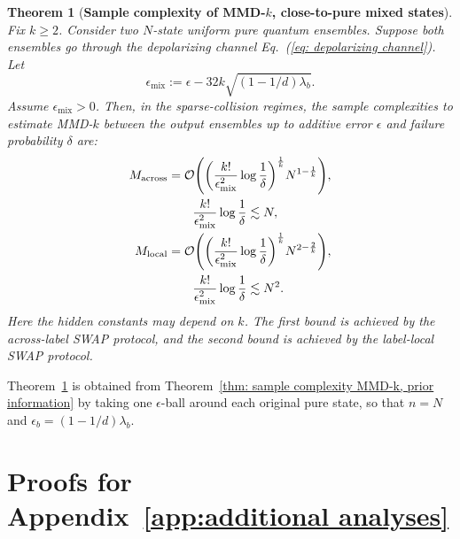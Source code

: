 \documentclass[aps,prx,reprint,superscriptaddress,amsmath,amssymb,longbibliography,floatfix]{revtex4-2}
\newcommand{\scO}{\mathcal{O}}
\theoremstyle{plain}
\newtheorem{theorem}{Theorem}[section]
\theoremstyle{definition}
\theoremstyle{remark}
\begin{document}
\begin{theorem}[\textbf{Sample complexity of MMD-$k$, close-to-pure mixed states}]
    \label{thm: sample complexity MMD-k, mixed state}
    Fix $k\ge2$. Consider two $N$-state uniform pure quantum ensembles. Suppose both ensembles go through the depolarizing channel Eq.~(\ref{eq: depolarizing channel}). Let
    \begin{equation}
        \epsilon_{\mathrm{mix}}
        :=
        \epsilon-32k\sqrt{(1-1/d)\lambda_b}.
    \end{equation}
    Assume $\epsilon_{\mathrm{mix}}>0$. Then, in the sparse-collision regimes, the sample complexities to estimate MMD-$k$ between the output ensembles up to additive error $\epsilon$ and failure probability $\delta$ are:
    \begin{align}
M_{\mathrm{across}}
        &=
        \scO\Bigg(
        \bigg(
            \frac{k!}{\epsilon_{\mathrm{mix}}^2}
            \log\frac{1}{\delta}
        \bigg)^{\frac1k}
        N^{1-\frac1k}
        \Bigg),
        \notag\\
        &\qquad
        \frac{k!}{\epsilon_{\mathrm{mix}}^2}\log\frac1\delta \lesssim N,
        \label{eq: M of MMD-k, mixed state, across upper bound}\\
        M_{\mathrm{local}}
        &=
        \scO\Bigg(
        \bigg(
            \frac{k!}{\epsilon_{\mathrm{mix}}^2}
            \log\frac{1}{\delta}
        \bigg)^{\frac1k}
        N^{2-\frac2k}
        \Bigg),
        \notag\\
        &\qquad
        \frac{k!}{\epsilon_{\mathrm{mix}}^2}\log\frac1\delta \lesssim N^2 .
        \label{eq: M of MMD-k, mixed state, local upper bound}
\end{align}
    Here the hidden constants may depend on $k$. The first bound is achieved by the across-label SWAP protocol, and the second bound is achieved by the label-local SWAP protocol.
\end{theorem}

Theorem~\ref{thm: sample complexity MMD-k, mixed state} is obtained from Theorem~\ref{thm: sample complexity MMD-k, prior information} by taking one $\epsilon$-ball around each original pure state, so that $n=N$ and $\epsilon_b=(1-1/d)\lambda_b$.


\section{Proofs for Appendix~\ref{app:additional analyses}
}
\end{document}
